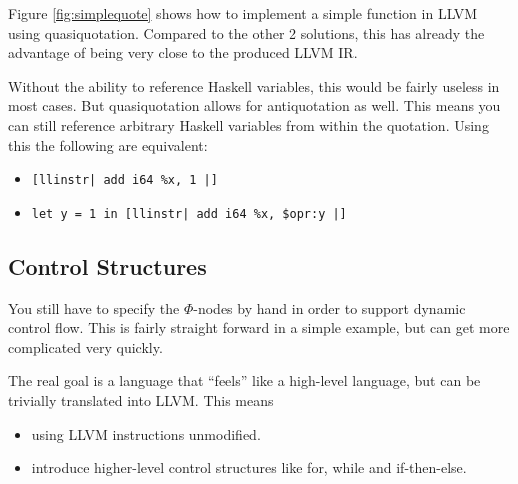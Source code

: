 \documentclass[a4paper,bibliography=totocnumbered,parskip,headsepline]{scrbook}
\begin{document}
Figure \ref{fig:simplequote} shows how to implement a simple function in LLVM using quasiquotation.
Compared to the other 2 solutions, this has already the advantage of being very close to the produced LLVM IR.

Without the ability to reference Haskell variables, this would be fairly useless in most cases.
But quasiquotation allows for antiquotation as well.
This means you can still reference arbitrary Haskell variables from within the quotation.
Using this the following are equivalent:
\begin{itemize}[noitemsep]
 \item \lstinline{[llinstr| add i64 %x, 1 |]}
 \item \lstinline{let y = 1 in [llinstr| add i64 %x, $opr:y |]}
\end{itemize}

\subsection{Control Structures}
You still have to specify the $\Phi$-nodes by hand in order to support dynamic control flow.
This is fairly straight forward in a simple example, but can get more complicated very quickly.

The real goal is a language that ``feels'' like a high-level language, but can be trivially translated into LLVM.
This means
\begin{itemize}[noitemsep]
 \item using LLVM instructions unmodified.
 \item introduce higher-level control structures like for, while and if-then-else.
\end{itemize}
\end{document}
